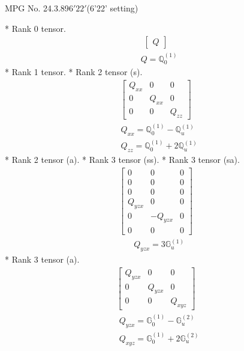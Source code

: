\documentclass[fleqn,8pt,landscape]{jsarticle}
\begin{document}
\setcounter{MaxMatrixCols}{32}

\renewcommand{\tablename}{Table~}
\renewcommand{\figurename}{Figure~}
\begin{center}
\LARGE
MPG No. 24.3.89\quad$6'22'$\quad(6'22' setting)
\end{center}
* Rank 0 tensor.
\begin{align*}
\begin{bmatrix} Q \end{bmatrix}
\end{align*}
\begin{align*}
& Q = \mathbb{Q}_{0}^{(1)}
\end{align*}
* Rank 1 tensor.
* Rank 2 tensor (s).
\begin{align*}
\begin{bmatrix} Q_{xx} & 0 & 0 \\ 0 & Q_{xx} & 0 \\ 0 & 0 & Q_{zz} \end{bmatrix}
\end{align*}
\begin{align*}
& Q_{xx} = \mathbb{Q}_{0}^{(1)} - \mathbb{Q}_{u}^{(1)} \\
& Q_{zz} = \mathbb{Q}_{0}^{(1)} + 2 \mathbb{Q}_{u}^{(1)}
\end{align*}
* Rank 2 tensor (a).
* Rank 3 tensor (ss).
* Rank 3 tensor (sa).
\begin{align*}
\begin{bmatrix} 0 & 0 & 0 \\ 0 & 0 & 0 \\ 0 & 0 & 0 \\ Q_{yzx} & 0 & 0 \\ 0 & - Q_{yzx} & 0 \\ 0 & 0 & 0 \end{bmatrix}
\end{align*}
\begin{align*}
& Q_{yzx} = 3 \mathbb{G}_{u}^{(1)}
\end{align*}
* Rank 3 tensor (a).
\begin{align*}
\begin{bmatrix} Q_{yzx} & 0 & 0 \\ 0 & Q_{yzx} & 0 \\ 0 & 0 & Q_{xyz} \end{bmatrix}
\end{align*}
\begin{align*}
& Q_{yzx} = \mathbb{G}_{0}^{(1)} - \mathbb{G}_{u}^{(2)} \\
& Q_{xyz} = \mathbb{G}_{0}^{(1)} + 2 \mathbb{G}_{u}^{(2)}
\end{align*}
\end{document}
